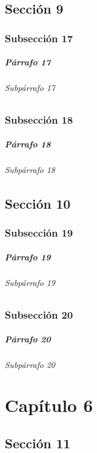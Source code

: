 \documentclass[11pt,a4paper]{book}
\begin{document}
      \section{Sección 9}
       \subsection{Subsección 17}
       \lipsum[1]
       \paragraph{Párrafo 17 }
       \lipsum[2] 
       \subparagraph{Subpárrafo 17} 
       \lipsum[4] 
       \subsection{Subsección 18}
       \lipsum[1]
       \paragraph{Párrafo 18 }
       \lipsum[2] 
       \subparagraph{Subpárrafo 18} 
       \lipsum[4] 
      \section{Sección 10}
       \subsection{Subsección 19}
       \lipsum[1]
       \paragraph{Párrafo 19 }
       \lipsum[2] 
       \subparagraph{Subpárrafo 19} 
       \lipsum[4] 
       \subsection{Subsección 20}
       \lipsum[1]
       \paragraph{Párrafo 20 }
       \lipsum[2] 
       \subparagraph{Subpárrafo 20} 
       \lipsum[4] 
     \chapter{Capítulo 6}
      \section{Sección 11}
\end{document}
